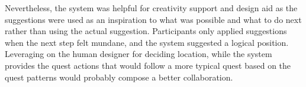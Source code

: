 Nevertheless, the system was helpful for creativity support and design aid as the suggestions were used as an inspiration to what was possible and what to do next rather than using the actual suggestion. Participants only applied suggestions when the next step felt mundane, and the system suggested a logical position. Leveraging on the human designer for deciding location, while the system provides the quest actions that would follow a more typical quest based on the quest patterns would probably compose a better collaboration. 





